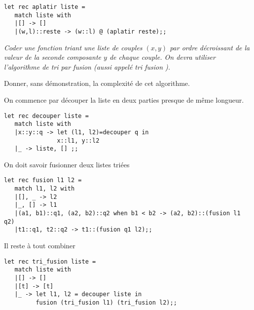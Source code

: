 \begin{Answer}
\begin{lstlisting}
let rec aplatir liste =
   match liste with
   |[] -> []
   |(w,l)::reste -> (w::l) @ (aplatir reste);;      
\end{lstlisting}
\end{Answer}
\begin{Exercise}\it 
Coder une fonction  triant une liste de couples $(x, y)$ par ordre décroissant de la valeur de la seconde composante $y$ de chaque couple. On devra utiliser l'algorithme de tri par fusion (aussi appelé \og  tri fusion \fg ). 

Donner, sans démonstration, la complexité de cet algorithme.
\end{Exercise}
\begin{Answer}
On commence par découper la liste en deux parties presque de même longueur.
\begin{lstlisting}
let rec decouper liste = 
   match liste with
   |x::y::q -> let (l1, l2)=decouper q in
               x::l1, y::l2
   |_ -> liste, [] ;;
\end{lstlisting}

On doit savoir fusionner deux listes triées
\begin{lstlisting}
let rec fusion l1 l2 = 
   match l1, l2 with
   |[], _ -> l2
   |_, [] -> l1
   |(a1, b1)::q1, (a2, b2)::q2 when b1 < b2 -> (a2, b2)::(fusion l1 q2)
   |t1::q1, t2::q2 -> t1::(fusion q1 l2);;
\end{lstlisting}
Il reste à tout combiner
\begin{lstlisting}
let rec tri_fusion liste = 
   match liste with
   |[] -> []
   |[t] -> [t]
   |_ -> let l1, l2 = decouper liste in
         fusion (tri_fusion l1) (tri_fusion l2);;
\end{lstlisting}
\end{Answer}
